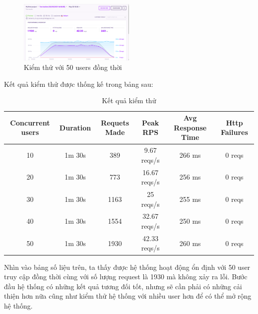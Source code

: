 		\begin{figure}[!ht]
			\includegraphics[width=0.5\textwidth]{Images/testing/testing_50.png}
			\centering
			\linebreak
			\caption{Kiểm thử với 50 users đồng thời}
		\end{figure}
		    Kết quả kiểm thử được thống kế trong bảng sau:
		    
        \begin{center}
        \begin{table}[!htp]
        \begin{tabular}{|c|c|c|c|c|c|}
        \hline 
        Concurrent users & Duration & Requets Made & Peak RPS & Avg Response Time & Http Failures\\ 
        \hline 
        10 & 1m 30s & 389 & 9.67 reqs/s & 266 ms & 0 reqs\\ 
        \hline
        20 & 1m 30s & 773 &  16.67 reqs/s & 256 ms & 0 reqs\\
        \hline 
        30 & 1m 30s & 1163 & 25 reqs/s & 255 ms & 0 reqs\\
        \hline
        40 & 1m 30s & 1554 & 32.67 reqs/s & 250 ms & 0 reqs\\
        \hline
        50 & 1m 30s & 1930 & 42.33 reqs/s & 260 ms & 0 reqs\\
        \hline
        \end{tabular}
        \caption{Kết quả kiểm thử}
        \end{table}
        \end{center}
        Nhìn vào bảng số liệu trên, ta thấy được hệ thống hoạt động ổn định với 50 user truy cập đồng thời cùng với số lượng request là 1930 mà không xảy ra lỗi. Bước đầu hệ thống có những kết quả tương đối tốt, nhưng sẽ cần phải có những cải thiện hơn nữa cũng như kiểm thử  hệ thống với nhiều user hơn để có thể mở rộng hệ thống.
